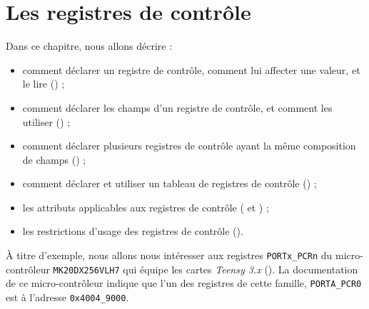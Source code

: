 

\chapter{Les registres de contrôle}



Dans ce chapitre, nous allons décrire :
\begin{itemize}
  \item comment déclarer un registre de contrôle, comment lui affecter une valeur, et le lire () ;
  \item comment déclarer les champs d'un registre de contrôle, et comment les utiliser () ;
  \item comment déclarer plusieurs registres de contrôle ayant la même composition de champs () ;
  \item comment déclarer et utiliser un tableau de registres de contrôle () ;
  \item les attributs applicables aux registres de contrôle ( et ) ;
  \item les restrictions d'usage des registres de contrôle ().
\end{itemize}

À titre d'exemple, nous allons nous intéresser aux registres \texttt{PORTx\_PCRn} du micro-contrôleur \texttt{MK20DX256VLH7} qui équipe les cartes \emph{Teensy 3.x} (). La documentation de ce micro-contrôleur indique que l'un des registres de cette famille, \texttt{PORTA\_PCR0} est à l'adresse \texttt{0x4004\_9000}.


